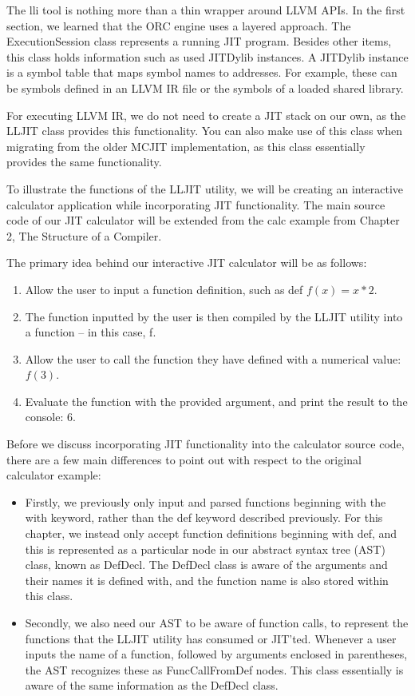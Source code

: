 
The lli tool is nothing more than a thin wrapper around LLVM APIs. In the first section, we learned that the ORC engine uses a layered approach. The ExecutionSession class represents a running JIT program. Besides other items, this class holds information such as used JITDylib instances. A JITDylib instance is a symbol table that maps symbol names to addresses. For example, these can be symbols defined in an LLVM IR file or the symbols of a loaded shared library.

For executing LLVM IR, we do not need to create a JIT stack on our own, as the LLJIT class provides this functionality. You can also make use of this class when migrating from the older MCJIT implementation, as this class essentially provides the same functionality.

To illustrate the functions of the LLJIT utility, we will be creating an interactive calculator application while incorporating JIT functionality. The main source code of our JIT calculator will be extended from the calc example from Chapter 2, The Structure of a Compiler.

The primary idea behind our interactive JIT calculator will be as follows:

\begin{enumerate}
\item
Allow the user to input a function definition, such as def $f(x) = x*2$.

\item
The function inputted by the user is then compiled by the LLJIT utility into a function – in
this case, f.

\item
Allow the user to call the function they have defined with a numerical value: $f(3)$.

\item
Evaluate the function with the provided argument, and print the result to the console: 6.
\end{enumerate}

Before we discuss incorporating JIT functionality into the calculator source code, there are a few main differences to point out with respect to the original calculator example:

\begin{itemize}
\item
Firstly, we previously only input and parsed functions beginning with the with keyword, rather than the def keyword described previously. For this chapter, we instead only accept function definitions beginning with def, and this is represented as a particular node in our abstract syntax tree (AST) class, known as DefDecl. The DefDecl class is aware of the arguments and their names it is defined with, and the function name is also stored within this class.

\item
Secondly, we also need our AST to be aware of function calls, to represent the functions that the LLJIT utility has consumed or JIT’ted. Whenever a user inputs the name of a function, followed by arguments enclosed in parentheses, the AST recognizes these as FuncCallFromDef nodes. This class essentially is aware of the same information as the DefDecl class.
\end{itemize}

